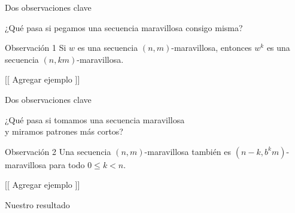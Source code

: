\documentclass[spanish,xcolor={table}]{beamer}
\begin{document}

\begin{frame}{Dos observaciones clave}

¿Qué pasa si pegamos una secuencia maravillosa consigo misma?

\bigskip

\begin{block}{Observación 1}
  Si $w$ es una secuencia $(n,m)$-maravillosa, entonces
  $w^k$ es una secuencia $(n,km)$-maravillosa.
\end{block}

\begin{example}
  {[[ Agregar ejemplo ]]}
\end{example}

\end{frame}


\begin{frame}{Dos observaciones clave}

¿Qué pasa si tomamos una secuencia maravillosa \\
y miramos patrones más cortos?

\bigskip

\begin{block}{Observación 2}
  Una secuencia $(n,m)$-maravillosa también es
  $(n-k,b^km)$-maravillosa para todo $0 \leq k < n$.
\end{block}

\begin{example}
  {[[ Agregar ejemplo ]]}
\end{example}

\end{frame}


\begin{frame}{Nuestro resultado}

  
\end{frame}

\end{document}
